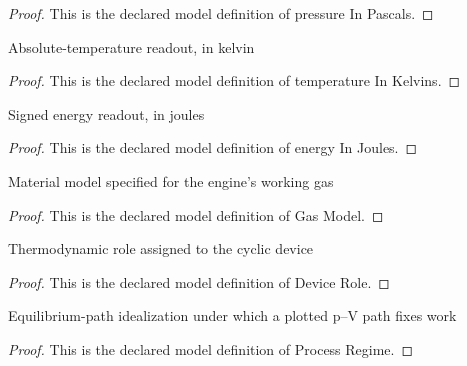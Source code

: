 \begin{proof}
  This is the declared model definition of pressure In Pascals.
\end{proof}
\begin{definition}
  \label{def:physics:phyx-mini-0482:phyxminiproblems-problemphyxmini0482-temperatureinkelvins}
  Absolute-temperature readout, in kelvin
\end{definition}
\begin{proof}
  This is the declared model definition of temperature In Kelvins.
\end{proof}
\begin{definition}
  \label{def:physics:phyx-mini-0482:phyxminiproblems-problemphyxmini0482-energyinjoules}
  Signed energy readout, in joules
\end{definition}
\begin{proof}
  This is the declared model definition of energy In Joules.
\end{proof}
\begin{definition}
  \label{def:physics:phyx-mini-0482:phyxminiproblems-problemphyxmini0482-gasmodel}
  Material model specified for the engine's working gas
\end{definition}
\begin{proof}
  This is the declared model definition of Gas Model.
\end{proof}
\begin{definition}
  \label{def:physics:phyx-mini-0482:phyxminiproblems-problemphyxmini0482-devicerole}
  Thermodynamic role assigned to the cyclic device
\end{definition}
\begin{proof}
  This is the declared model definition of Device Role.
\end{proof}
\begin{definition}
  \label{def:physics:phyx-mini-0482:phyxminiproblems-problemphyxmini0482-processregime}
  Equilibrium-path idealization under which a plotted p--V path fixes work
\end{definition}
\begin{proof}
  This is the declared model definition of Process Regime.
\end{proof}
